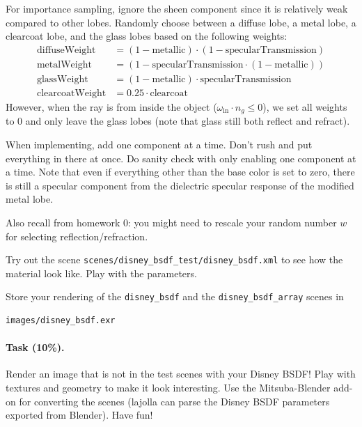 For importance sampling, ignore the sheen component since it is relatively weak compared to other lobes. Randomly choose between a diffuse lobe, a metal lobe, a clearcoat lobe, and the glass lobes based on the following weights:
\begin{equation}
\begin{aligned}
\text{diffuseWeight} &= (1 - \text{metallic}) \cdot (1 - \text{specularTransmission}) \\
\text{metalWeight} &= (1 - \text{specularTransmission} \cdot (1 - \text{metallic})) \\
\text{glassWeight} &= (1 - \text{metallic}) \cdot \text{specularTransmission} \\
\text{clearcoatWeight} &= 0.25 \cdot \text{clearcoat}
\end{aligned}
\end{equation}
However, when the ray is from inside the object ($\omega_{\text{in}} \cdot n_g \leq 0$), we set all weights
to $0$ and only leave the glass lobes (note that glass still both reflect and refract).

When implementing, add one component at a time. Don't rush and put everything in there at once. Do sanity check with only enabling one component at a time. Note that even if everything other than the base color is set to zero, there is still a specular component from the dielectric specular response of the modified metal lobe. 

Also recall from homework 0: you might need to rescale your random number $w$ for selecting reflection/refraction.

Try out the scene \lstinline{scenes/disney_bsdf_test/disney_bsdf.xml} to see how the material look like. Play with the parameters.

Store your rendering of the \lstinline{disney_bsdf} and the \lstinline{disney_bsdf_array} scenes in
\begin{lstlisting}
images/disney_bsdf.exr
\end{lstlisting}

\paragraph{Task (10\%).} Render an image that is not in the test scenes with your Disney BSDF! Play with textures and geometry to make it look interesting. Use the Mitsuba-Blender add-on for converting the scenes (lajolla can parse the Disney BSDF parameters exported from Blender). Have fun!




